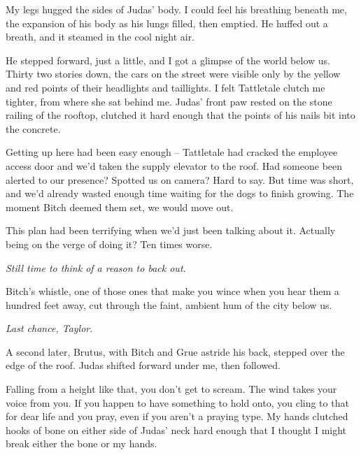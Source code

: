 





My legs hugged the sides of Judas' body.  I could feel his breathing beneath me, the expansion of his body as his lungs filled, then emptied.  He huffed out a breath, and it steamed in the cool night air.



He stepped forward, just a little, and I got a glimpse of the world below us.  Thirty two stories down, the cars on the street were visible only by the yellow and red points of their headlights and taillights.  I felt Tattletale clutch me tighter, from where she sat behind me.  Judas' front paw rested on the stone railing of the rooftop, clutched it hard enough that the points of his nails bit into the concrete.



Getting up here had been easy enough – Tattletale had cracked the employee access door and we'd taken the supply elevator to the roof.  Had someone been alerted to our presence?  Spotted us on camera?  Hard to say.  But time was short, and we'd already wasted enough time waiting for the dogs to finish growing.  The moment Bitch deemed them set, we would move out.



This plan had been terrifying when we'd just been talking about it.  Actually being on the verge of doing it?  Ten times worse.



\emph{Still time to think of a reason to back out.}



Bitch's whistle, one of those ones that make you wince when you hear them a hundred feet away, cut through the faint, ambient hum of the city below us.



\emph{Last chance, Taylor}.



A second later, Brutus, with Bitch and Grue astride his back, stepped over the edge of the roof.  Judas shifted forward under me, then followed.



Falling from a height like that, you don't get to scream.  The wind takes your voice from you.  If you happen to have something to hold onto, you cling to that for dear life and you pray, even if you aren't a praying type.  My hands clutched hooks of bone on either side of Judas' neck hard enough that I thought I might break either the bone or my hands.



